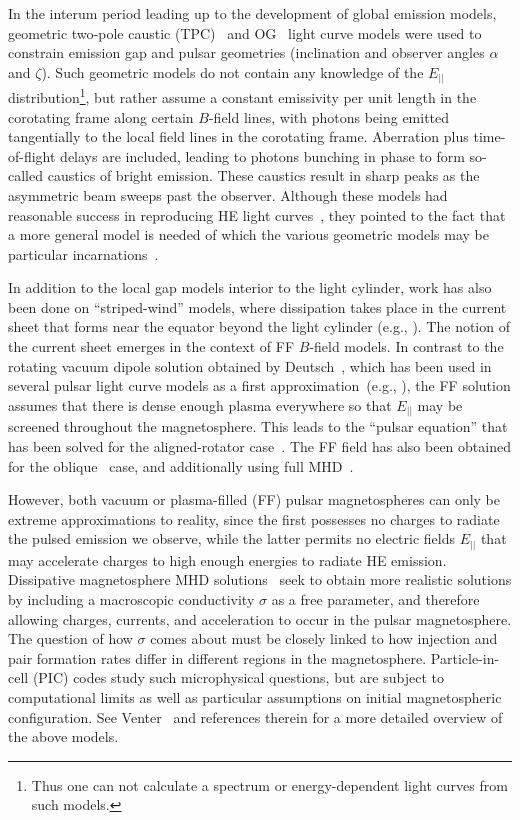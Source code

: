 \documentclass{PoS}
\begin{document}
In the interum period leading up to the development of global emission models, geometric two-pole caustic (TPC)~\cite{Bai10,DR03,Dyks04} and OG~\cite{Venter09,Watters09} light curve models were used to constrain emission gap and pulsar geometries (inclination and observer angles $\alpha$ and $\zeta$). Such geometric models do not contain any knowledge of the $E_{||}$ distribution\footnote{Thus one can not calculate a spectrum or energy-dependent light curves from such models.}, but rather assume a constant emissivity per unit length in the corotating frame along certain $B$-field lines, with photons being emitted tangentially to the local field lines in the corotating frame. Aberration plus time-of-flight delays are included, leading to photons bunching in phase to form so-called caustics of bright emission. These caustics result in sharp peaks as the asymmetric beam sweeps past the observer. Although these models had reasonable success in reproducing HE light curves~\cite{Johnson14, Pierbattista15,Venter09,Venter12}, they pointed to the fact that a more general model is needed of which the various geometric models may be particular incarnations~\cite{Venter14}.

In addition to the local gap models interior to the light cylinder, work has also been done on ``striped-wind'' models, where dissipation takes place in the current sheet that forms near the equator beyond the light cylinder (e.g., \cite{Petri11,Petri12}). The notion of the current sheet emerges in the context of FF $B$-field models. In contrast to the rotating vacuum dipole solution obtained by Deutsch~\cite{Deutsch55}, which has been used in several pulsar light curve models as a first approximation~(e.g., \cite{Dyks04,Venter09}), the FF solution assumes that there is dense enough plasma everywhere so that $E_{||}$ may be screened throughout the magnetosphere. This leads to the ``pulsar equation'' that has been solved for the aligned-rotator case~\cite{CFK99}. The FF field has also been obtained for the oblique~\cite{Spitkovsky2006} case, and additionally using full MHD~\cite{Komissarov07, Tchekhovskoy13}. 

However, both vacuum or plasma-filled (FF) pulsar magnetospheres can only be extreme approximations to reality, since the first possesses no charges to radiate the pulsed emission we observe, while the latter permits no electric fields $E_{||}$ that may accelerate charges to high enough energies to radiate HE emission. Dissipative magnetosphere MHD solutions~\cite{Kalapotharakos12, Kalapotharakos14, Li12} seek to obtain more realistic solutions by including a macroscopic conductivity $\sigma$ as a free parameter, and therefore allowing charges, currents, and acceleration to occur in the pulsar magnetosphere. The question of how $\sigma$ comes about must be closely linked to how injection and pair formation rates differ in different regions in the magnetosphere. Particle-in-cell (PIC) codes study such microphysical questions, but are subject to computational limits as well as particular assumptions on initial magnetospheric configuration. See Venter~\cite{Venter16_HEASA} and references therein for a more detailed overview of the above models.
\end{document}

